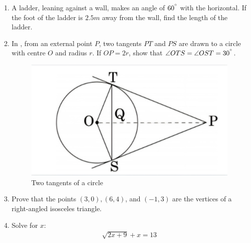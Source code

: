 \documentclass{article}
\begin{document}
\begin{enumerate}                                                                                    
	\item A ladder, leaning against a wall, makes an angle of $60^{\degree}$ with the horizontal. If the foot of the ladder is $2.5m$ away from the wall, find the length of the ladder.  

\item In , from an external point $P$, two tangents $PT$ and $PS$ are drawn to a circle with centre $O$ and radius $r$. If $OP = 2r$, show that $\angle OTS = \angle OST = 30^{\degree}$.
    \begin{figure}[H]
    \includegraphics[width=\columnwidth]{./figs/tangentofcircle.jpg}                            	
    \caption{Two tangents of a circle}      
    \label{fig:tangentofcircle}              
    \end{figure}                                                                                             

\item Prove that the points $(3, 0), (6, 4)$, and $(-1, 3)$ are the vertices of a right-angled isosceles triangle.                                                                                             
                                                                              

\item Solve for $x$:
    \begin{align}
        \sqrt{2x+9} + x = 13
    \end{align}                                                                                             
                                                                                         

\end{enumerate}
\end{document}
